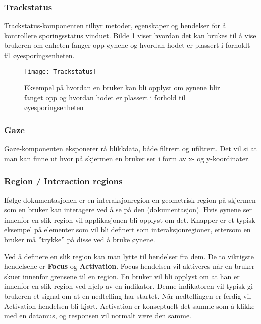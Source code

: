 \subsubsection{Trackstatus}
Trackstatus-komponenten tilbyr metoder, egenskaper og hendelser for å kontrollere sporingsstatus vinduet. Bilde \ref{fig:track} viser hvordan det kan brukes til å vise brukeren om enheten fanger opp øynene og hvordan hodet er plassert i forholdt til øyesporingsenheten.

\begin{figure}[ht!]
\centering
\texttt{[image: Trackstatus]}
\caption{Eksempel på hvordan en bruker kan bli opplyst om øynene blir fanget opp og hvordan hodet er plassert i forhold til øyesporingsenheten}
\label{fig:track}
\end{figure}

\subsubsection{Gaze}
Gaze-komponenten eksponerer rå blikkdata, både filtrert og ufiltrert. Det vil si at man kan finne ut hvor på skjermen en bruker ser i form av x- og y-koordinater.  


\subsubsection{Region / Interaction regions}

Ifølge dokumentasjonen er en interaksjonregion en geometrisk region på skjermen som en bruker kan interagere ved å se på den (dokumentasjon). Hvis øynene ser innenfor en slik region vil applikasjonen bli opplyst om det. Knapper er et typisk eksempel på elementer som vil bli definert som interaksjonregioner, ettersom en bruker må ”trykke” på disse ved å bruke øynene. 

Ved å definere en slik region kan man lytte til hendelser fra dem. De to viktigste hendelsene er \textbf{Focus} og \textbf{Activation}. Focus-hendelsen vil aktiveres når en bruker skuer innenfor grensene til en region. En bruker vil bli opplyst om at han er innenfor en slik region ved hjelp av en indikator. Denne indikatoren vil typisk gi brukeren et signal om at en nedtelling har startet. Når nedtellingen er ferdig vil Activation-hendelsen bli kjørt. Activation er konseptuelt det samme som å klikke med en datamus, og responsen vil normalt være den samme.  




